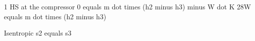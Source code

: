 1 HS at the compressor  
0 equals m dot times (h2 minus h3) minus W dot K  
28W equals m dot times (h2 minus h3)  

Isentropic  
s2 equals s3